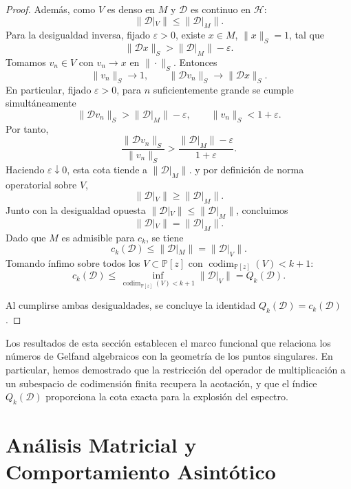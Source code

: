 \documentclass[12pt,a4paper]{article}
\theoremstyle{definition}
\theoremstyle{remark}
\newcommand{\Poly}{\mathbb{P}[z]}
\newcommand{\D}{\mathcal{D}}
\begin{document}
\begin{proof}
  Además, como $V$ es denso en $M$ y $\D$ es continuo en $\mathcal{H}$:
  \[
    \|\D|_V\|\le \|\D|_M\|.
  \]
  Para la desigualdad inversa, fijado $\varepsilon>0$, existe $x\in M$, $\|x\|_S=1$, tal que
  \[
    \|\D x\|_S>\|\D|_M\|-\varepsilon.
  \]
  Tomamos $v_n\in V$ con $v_n\to x$ en $\|\cdot\|_S$. Entonces
  \[
    \|v_n\|_S\to 1,
    \qquad
    \|\D v_n\|_S\to \|\D x\|_S.
  \]
  En particular, fijado $\varepsilon>0$, para $n$ suficientemente grande se cumple simultáneamente
  \[
    \|\D v_n\|_S>\|\D|_M\|-\varepsilon,
    \qquad
    \|v_n\|_S<1+\varepsilon.
  \]
  Por tanto,
  \[
    \frac{\|\D v_n\|_S}{\|v_n\|_S}
    >
    \frac{\|\D|_M\|-\varepsilon}{1+\varepsilon}.
  \]
  Haciendo $\varepsilon\downarrow 0$, esta cota tiende a $\|\D|_M\|$.
  y por definición de norma operatorial sobre $V$,
  \[
    \|\D|_V\|\ge \|\D|_M\|.
  \]
  Junto con la desigualdad opuesta $\|\D|_V\|\le \|\D|_M\|$, concluimos
  \[
    \|\D|_V\|=\|\D|_M\|.
  \]
  Dado que $M$ es admisible para $c_k$, se tiene
  \[
    c_k(\D)\le \|\D|_M\|=\|\D|_V\|.
  \]
  Tomando ínfimo sobre todos los $V\subset\Poly$ con $\operatorname{codim}_{\Poly}(V)<k+1$:
  \[
    c_k(\D)\le \inf_{\operatorname{codim}_{\Poly}(V)<k+1}\|\D|_V\|=Q_k(\D).
  \]

  Al cumplirse ambas desigualdades, se concluye la identidad $Q_k(\D) = c_k(\D)$.
\end{proof}

Los resultados de esta sección establecen el marco funcional que relaciona los números de Gelfand algebraicos con la geometría de los puntos singulares. En particular, hemos demostrado que la restricción del operador de multiplicación a un subespacio de codimensión finita recupera la acotación, y que el índice $Q_k(\D)$ proporciona la cota exacta para la explosión del espectro.

\section{Análisis Matricial y Comportamiento Asintótico}\label{sec:matricial}
\end{document}
